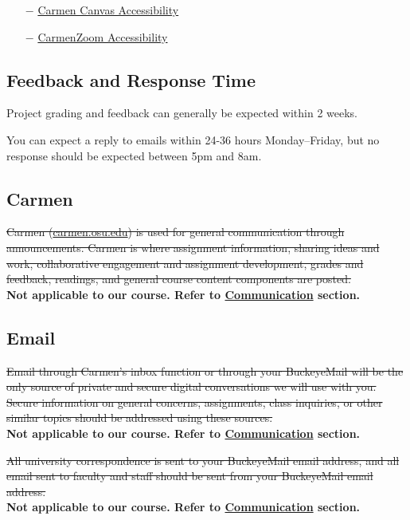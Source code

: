 \documentclass[12pt,letter,english]{report}
\providecommand{\tightlist}{%
      \setlength{\itemsep}{0pt}\setlength{\parskip}{0pt}%
}
\begin{document}
\begin{itemize}
      \tightlist
      \item[$-$] \href{https://community.canvaslms.com/docs/DOC-2061}{Carmen Canvas Accessibility}
      \item[$-$] \href{https://go.osu.edu/Bqd4}{CarmenZoom Accessibility}
\end{itemize}

\subsection{Feedback and Response Time}

Project grading and feedback can generally be expected within 2 weeks.

You can expect a reply to emails within 24-36 hours Monday--Friday, but no response should be expected between 5pm and 8am.

\subsection{Carmen}

\sout{Carmen (\href{http://carmen.osu.edu/}{carmen.osu.edu}) is used for general communication through announcements. Carmen is where assignment information, sharing ideas and work, collaborative engagement and assignment development, grades and feedback, readings, and general course content components are posted.}\\
\textbf{Not applicable to our course. Refer to \hyperlink{communication}{Communication} section.}

\subsection{Email}

\sout{Email through Carmen's inbox function or through your BuckeyeMail will be the only source of private and secure digital conversations we will use with you. Secure information on general concerns, assignments, class inquiries, or other similar topics should be addressed using these sources.}\\
\textbf{Not applicable to our course. Refer to \hyperlink{communication}{Communication} section.}

\sout{All university correspondence is sent to your BuckeyeMail email address, and all email sent to faculty and staff should be sent from your BuckeyeMail email address.}\\
\textbf{Not applicable to our course. Refer to \hyperlink{communication}{Communication} section.}
\end{document}
